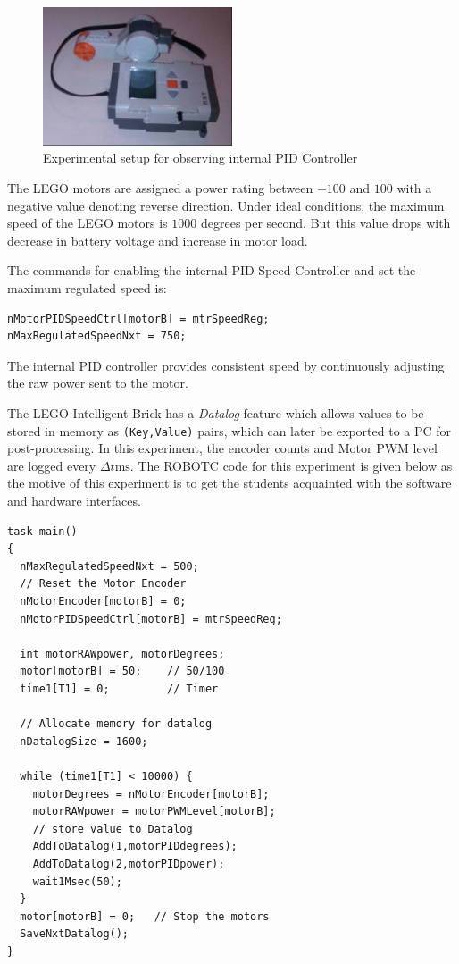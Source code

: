 \documentclass[paper=a4, fontsize=11pt]{scrartcl}
\numberwithin{equation}{section}        %
\numberwithin{figure}{section}          %
\numberwithin{table}{section}           %
\begin{document}
\begin{figure}[!hbp]
	\includegraphics[width=0.5\textwidth]{pid_setup}
	\caption{Experimental setup for observing internal PID Controller}
	\label{fig:pid_setup}
\end{figure}

The LEGO motors are assigned a power rating between $-100$ and $100$ with a negative value denoting reverse direction. Under ideal conditions, the maximum speed of the LEGO motors is $1000$ degrees per second. But this value drops with decrease in battery voltage and increase in motor load. 

The commands for enabling the internal PID Speed Controller and set the maximum regulated speed is:
\begin{verbatim}
nMotorPIDSpeedCtrl[motorB] = mtrSpeedReg;
nMaxRegulatedSpeedNxt = 750;
\end{verbatim}
The internal PID controller provides consistent speed by continuously adjusting the raw power sent to the motor.

The LEGO Intelligent Brick has a \emph{Datalog} feature which allows values to be stored in memory as \verb|(Key,Value)| pairs, which can later be exported to a PC for post-processing. In this experiment, the encoder counts and Motor PWM level are logged every $\Delta{}t  \text{ms}$. The ROBOTC code for this experiment is given below as the motive of this experiment is to get the students acquainted with the software and hardware interfaces. 
\begin{verbatim}
task main()
{
  nMaxRegulatedSpeedNxt = 500;
  // Reset the Motor Encoder
  nMotorEncoder[motorB] = 0;
  nMotorPIDSpeedCtrl[motorB] = mtrSpeedReg;

  int motorRAWpower, motorDegrees;
  motor[motorB] = 50;    // 50/100
  time1[T1] = 0;         // Timer

  // Allocate memory for datalog
  nDatalogSize = 1600;

  while (time1[T1] < 10000) {
    motorDegrees = nMotorEncoder[motorB];
    motorRAWpower = motorPWMLevel[motorB];     
    // store value to Datalog
    AddToDatalog(1,motorPIDdegrees);
    AddToDatalog(2,motorPIDpower);
    wait1Msec(50);
  }
  motor[motorB] = 0;   // Stop the motors
  SaveNxtDatalog();
}
\end{verbatim}
\end{document}
